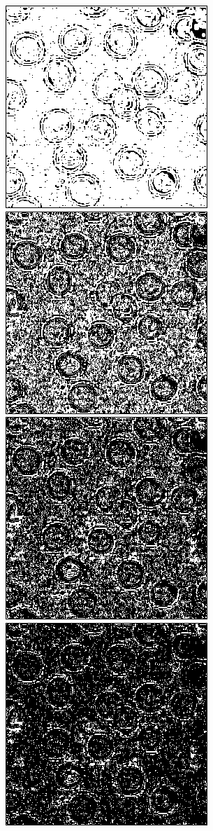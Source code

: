 \documentclass[a4paper,12pt]{report}
\begin{document}
\begin{figure}[!ht]
	\center	
	\includegraphics[scale=0.5]{image/laplacian_seuil0.png}
	\includegraphics[scale=0.5]{image/laplacian_seuil3.png}
	\includegraphics[scale=0.5]{image/laplacian_seuil6.png}
	\includegraphics[scale=0.5]{image/laplacian_seuil10.png}

\end{figure}
\end{document}
